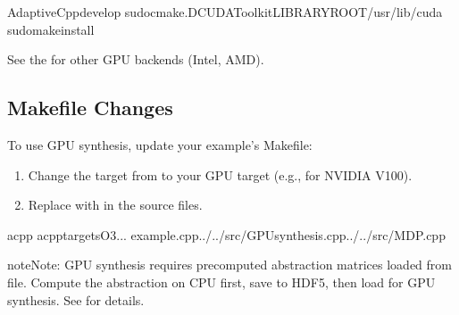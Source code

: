 \documentclass[a4paper,10pt,english]{sphinxmanual}
\begin{document}
\begin{sphinxVerbatim}[commandchars=\\\{\}]
AdaptiveCpp\PYGZhy{}develop
sudocmake.\PYGZhy{}DCUDAToolkit\PYGZus{}LIBRARY\PYGZus{}ROOT/usr/lib/cuda
sudomakeinstall
\end{sphinxVerbatim}

\sphinxAtStartPar
See the 
for other GPU backends (Intel, AMD).


\subsection{Makefile Changes}
\label{\detokenize{getting-started/gpu:makefile-changes}}
\sphinxAtStartPar
To use GPU synthesis, update your example’s Makefile:
\begin{enumerate}
%
\item {} 
\sphinxAtStartPar
Change the target from  to your GPU target
(e.g.,  for NVIDIA V100).

\item {} 
\sphinxAtStartPar
Replace  with  in the source files.

\end{enumerate}

\begin{sphinxVerbatim}[commandchars=\\\{\}]
acpp
\PYGZhy{}\PYGZhy{}acpp\PYGZhy{}targets\PYGZhy{}O3...
example.cpp../../src/GPU\PYGZus{}synthesis.cpp../../src/MDP.cpp
\end{sphinxVerbatim}

\begin{sphinxadmonition}{note}{Note:}
\sphinxAtStartPar
GPU synthesis requires pre\sphinxhyphen{}computed abstraction matrices loaded from file.
Compute the abstraction on CPU first, save to HDF5, then load for GPU synthesis.
See {\hyperref[\detokenize{user-guide/io::doc}]{}} for details.
\end{sphinxadmonition}
\end{document}
